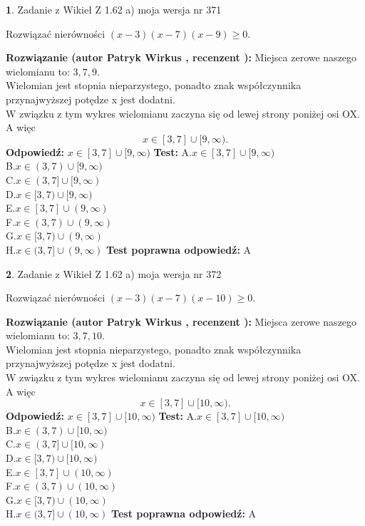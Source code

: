 \documentclass[12pt, a4paper]{article}
\theoremstyle{definition} %
\newtheorem{zad}{}
\newcommand{\zadStart}[1]{\begin{zad}#1\newline}
\newcommand{\zadStop}{\end{zad}}
\newcommand{\rozwStart}[2]{\noindent \textbf{Rozwiązanie (autor #1 , recenzent #2): }\newline}
\newcommand{\rozwStop}{\newline}
\newcommand{\odpStart}{\noindent \textbf{Odpowiedź:}\newline}
\newcommand{\odpStop}{\newline}
\newcommand{\testStart}{\noindent \textbf{Test:}\newline}
\newcommand{\testStop}{\newline}
\newcommand{\kluczStart}{\noindent \textbf{Test poprawna odpowiedź:}\newline}
\newcommand{\kluczStop}{\newline}
\begin{document}
\zadStart{Zadanie z Wikieł Z 1.62 a) moja wersja nr 371}

Rozwiązać nierówności $(x-3)(x-7)(x-9)\ge0$.
\zadStop
\rozwStart{Patryk Wirkus}{}
Miejsca zerowe naszego wielomianu to: $3, 7, 9$.\\
Wielomian jest stopnia nieparzystego, ponadto znak współczynnika przy\linebreak najwyższej potędze x jest dodatni.\\ W związku z tym wykres wielomianu zaczyna się od lewej strony poniżej osi OX. A więc $$x \in [3,7] \cup [9,\infty).$$
\rozwStop
\odpStart
$x \in [3,7] \cup [9,\infty)$
\odpStop
\testStart
A.$x \in [3,7] \cup [9,\infty)$\\
B.$x \in (3,7) \cup [9,\infty)$\\
C.$x \in (3,7] \cup [9,\infty)$\\
D.$x \in [3,7) \cup [9,\infty)$\\
E.$x \in [3,7] \cup (9,\infty)$\\
F.$x \in (3,7) \cup (9,\infty)$\\
G.$x \in [3,7) \cup (9,\infty)$\\
H.$x \in (3,7] \cup (9,\infty)$
\testStop
\kluczStart
A
\kluczStop



\zadStart{Zadanie z Wikieł Z 1.62 a) moja wersja nr 372}

Rozwiązać nierówności $(x-3)(x-7)(x-10)\ge0$.
\zadStop
\rozwStart{Patryk Wirkus}{}
Miejsca zerowe naszego wielomianu to: $3, 7, 10$.\\
Wielomian jest stopnia nieparzystego, ponadto znak współczynnika przy\linebreak najwyższej potędze x jest dodatni.\\ W związku z tym wykres wielomianu zaczyna się od lewej strony poniżej osi OX. A więc $$x \in [3,7] \cup [10,\infty).$$
\rozwStop
\odpStart
$x \in [3,7] \cup [10,\infty)$
\odpStop
\testStart
A.$x \in [3,7] \cup [10,\infty)$\\
B.$x \in (3,7) \cup [10,\infty)$\\
C.$x \in (3,7] \cup [10,\infty)$\\
D.$x \in [3,7) \cup [10,\infty)$\\
E.$x \in [3,7] \cup (10,\infty)$\\
F.$x \in (3,7) \cup (10,\infty)$\\
G.$x \in [3,7) \cup (10,\infty)$\\
H.$x \in (3,7] \cup (10,\infty)$
\testStop
\kluczStart
A
\kluczStop
\end{document}
